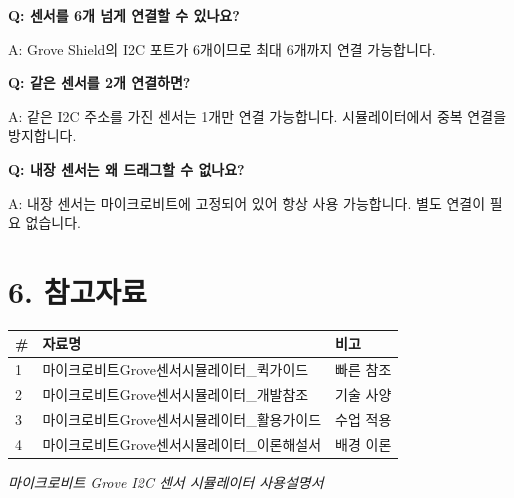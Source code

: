\documentclass[11pt,a4paper]{article}
\begin{document}
\textbf{Q: 센서를 6개 넘게 연결할 수 있나요?}


A: Grove Shield의 I2C 포트가 6개이므로 최대 6개까지 연결 가능합니다.


\textbf{Q: 같은 센서를 2개 연결하면?}


A: 같은 I2C 주소를 가진 센서는 1개만 연결 가능합니다. 시뮬레이터에서 중복 연결을 방지합니다.


\textbf{Q: 내장 센서는 왜 드래그할 수 없나요?}


A: 내장 센서는 마이크로비트에 고정되어 있어 항상 사용 가능합니다. 별도 연결이 필요 없습니다.



\section*{6. 참고자료}

\begin{center}
\renewcommand{\arraystretch}{1.4}
\begin{tabular}{|p{1.5cm}|p{11.0cm}|p{2.5cm}|}
\hline
\rowcolor{tableheader}
\textbf{\#} & \textbf{자료명} & \textbf{비고} \\
\hline
1 & 마이크로비트Grove센서시뮬레이터\_퀵가이드 & 빠른 참조 \\
\hline
2 & 마이크로비트Grove센서시뮬레이터\_개발참조 & 기술 사양 \\
\hline
3 & 마이크로비트Grove센서시뮬레이터\_활용가이드 & 수업 적용 \\
\hline
4 & 마이크로비트Grove센서시뮬레이터\_이론해설서 & 배경 이론 \\
\hline
\end{tabular}
\end{center}


\vfill
\begin{center}
\small\color{lightbrown}
\textit{마이크로비트 Grove I2C 센서 시뮬레이터 사용설명서}
\end{center}
\end{document}
